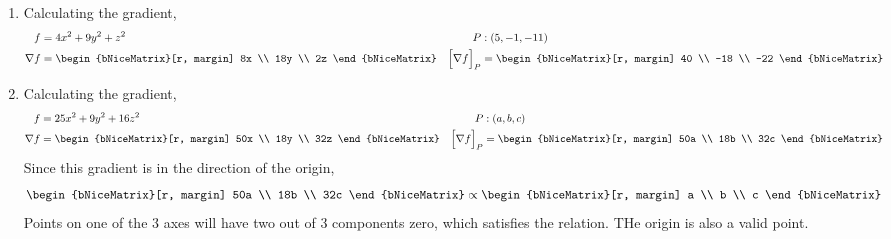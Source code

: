 \begin{enumerate}
    \item Calculating the gradient,
          \begin{align}
              f                      & = 4x^2 + 9y^2 + z^2              &
              P                      & : (5, -1, -11)                     \\
              \nabla f               & = \begin{bNiceMatrix}[r, margin]
                                             8x \\ 18y \\ 2z
                                         \end{bNiceMatrix} &
              \Big[ \nabla f \Big]_P & = \begin{bNiceMatrix}[r, margin]
                                             40 \\ -18 \\ -22
                                         \end{bNiceMatrix}
          \end{align}

    \item Calculating the gradient,
          \begin{align}
              f                      & = 25x^2 + 9y^2 + 16z^2           &
              P                      & : (a, b, c)                        \\
              \nabla f               & = \begin{bNiceMatrix}[r, margin]
                                             50x \\ 18y \\ 32z
                                         \end{bNiceMatrix} &
              \Big[ \nabla f \Big]_P & = \begin{bNiceMatrix}[r, margin]
                                             50a \\ 18b \\ 32c
                                         \end{bNiceMatrix}
          \end{align}
          Since this gradient is in the direction of the origin,
          \begin{align}
              \begin{bNiceMatrix}[r, margin]
                  50a \\ 18b \\ 32c
              \end{bNiceMatrix} & \propto \begin{bNiceMatrix}[r, margin]
                                              a \\ b \\ c
                                          \end{bNiceMatrix} \\
          \end{align}
          Points on one of the 3 axes will have two out of 3 components zero, which
          satisfies the relation. THe origin is also a valid point.


\end{enumerate}
